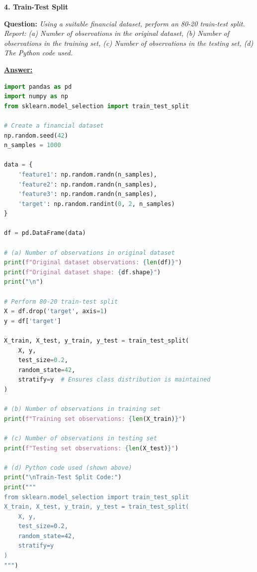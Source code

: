 \documentclass[11pt,a4paper]{article}
\newcommand{\questiontitle}[2]{%
    \vspace{0.4cm}%
    \noindent\textbf{\large\color{headerblue}#1. #2}\par\vspace{0.15cm}%
}
\newcommand{\qprompt}[1]{%
    \noindent\textbf{Question:} \textit{#1}\par\vspace{0.2cm}%
}
\newcommand{\answer}{\noindent\textbf{\underline{Answer:}}\par\vspace{0.15cm}}
\begin{document}
\vspace{0.35cm}

\questiontitle{4}{Train-Test Split}
\qprompt{Using a suitable financial dataset, perform an 80-20 train-test split. Report: (a) Number of observations in the original dataset, (b) Number of observations in the training set, (c) Number of observations in the testing set, (d) The Python code used.}
\answer
\begin{lstlisting}[language=Python]
import pandas as pd
import numpy as np
from sklearn.model_selection import train_test_split

# Create a financial dataset
np.random.seed(42)
n_samples = 1000

data = {
    'feature1': np.random.randn(n_samples),
    'feature2': np.random.randn(n_samples),
    'feature3': np.random.randn(n_samples),
    'target': np.random.randint(0, 2, n_samples)
}

df = pd.DataFrame(data)

# (a) Number of observations in original dataset
print(f"Original dataset observations: {len(df)}")
print(f"Original dataset shape: {df.shape}")
print("\n")

# Perform 80-20 train-test split
X = df.drop('target', axis=1)
y = df['target']

X_train, X_test, y_train, y_test = train_test_split(
    X, y, 
    test_size=0.2,
    random_state=42,
    stratify=y  # Ensures class distribution is maintained
)

# (b) Number of observations in training set
print(f"Training set observations: {len(X_train)}")

# (c) Number of observations in testing set
print(f"Testing set observations: {len(X_test)}")

# (d) Python code used (shown above)
print("\nTrain-Test Split Code:")
print("""
from sklearn.model_selection import train_test_split
X_train, X_test, y_train, y_test = train_test_split(
    X, y, 
    test_size=0.2,
    random_state=42,
    stratify=y
)
""")
\end{lstlisting}

\vspace{0.35cm}
\end{document}
